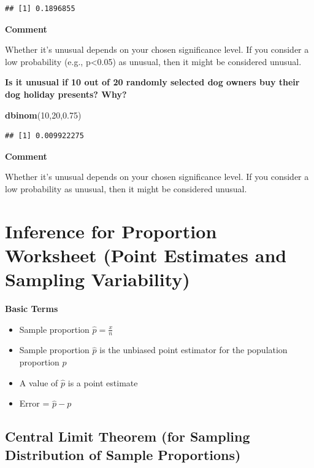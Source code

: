 \documentclass[
]{book}
\newenvironment{Shaded}{\begin{snugshade}}{\end{snugshade}}
\newcommand{\DecValTok}[1]{\textcolor[rgb]{0.00,0.00,0.81}{#1}}
\newcommand{\FloatTok}[1]{\textcolor[rgb]{0.00,0.00,0.81}{#1}}
\newcommand{\FunctionTok}[1]{\textcolor[rgb]{0.13,0.29,0.53}{\textbf{#1}}}
\newcommand{\NormalTok}[1]{#1}
\providecommand{\tightlist}{%
  \setlength{\itemsep}{0pt}\setlength{\parskip}{0pt}}
\begin{document}
\begin{verbatim}
## [1] 0.1896855
\end{verbatim}

\textbf{Comment}

Whether it's unusual depends on your chosen significance level. If you consider a low probability (e.g., p\textless0.05) as unusual, then it might be considered unusual.

\textbf{Is it unusual if 10 out of 20 randomly selected dog owners buy their dog holiday presents? Why?}

\begin{Shaded}
\begin{Highlighting}[]
\FunctionTok{dbinom}\NormalTok{(}\DecValTok{10}\NormalTok{,}\DecValTok{20}\NormalTok{,}\FloatTok{0.75}\NormalTok{)}
\end{Highlighting}
\end{Shaded}

\begin{verbatim}
## [1] 0.009922275
\end{verbatim}

\textbf{Comment}

Whether it's unusual depends on your chosen significance level. If you consider a low probability as unusual, then it might be considered unusual.

\chapter{Inference for Proportion Worksheet (Point Estimates and Sampling Variability)}\label{inference-for-proportion-worksheet-point-estimates-and-sampling-variability}

\textbf{Basic Terms}

\begin{itemize}
\tightlist
\item
  Sample proportion \(\hat{p} = \frac{x}{n}\)\\
\item
  Sample proportion \(\hat{p}\) is the unbiased point estimator for the population proportion \(p\)
\item
  A value of \(\hat{p}\) is a point estimate
\item
  Error = \(\hat{p} - p\)
\end{itemize}

\section{Central Limit Theorem (for Sampling Distribution of Sample Proportions)}\label{central-limit-theorem-for-sampling-distribution-of-sample-proportions}
\end{document}
